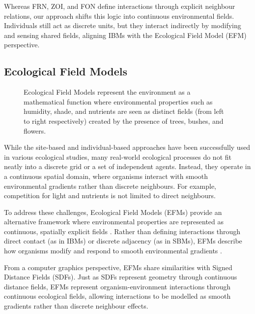 \midConclusion 

Whereas FRN, ZOI, and FON define interactions through explicit neighbour relations, our approach shifts this logic into continuous environmental fields. Individuals still act as discrete units, but they interact indirectly by modifying and sensing shared fields, aligning IBMs with the Ecological Field Model (EFM) perspective.

\subsection{Ecological Field Models}

\begin{figure}
    \caption{Ecological Field Models represent the environment as a mathematical function where environmental properties such as humidity, shade, and nutrients are seen as distinct fields (from left to right respectively) created by the presence of trees, bushes, and flowers.}
    \label{fig:env-obj-ecological-field-models}
\end{figure}

While the site-based and individual-based approaches have been successfully used in various ecological studies, many real-world ecological processes do not fit neatly into a discrete grid or a set of independent agents. Instead, they operate in a continuous spatial domain, where organisms interact with smooth environmental gradients rather than discrete neighbours. For example, competition for light and nutrients is not limited to direct neighbours.

To address these challenges, Ecological Field Models (EFMs) provide an alternative framework where environmental properties are represented as continuous, spatially explicit fields \cite{Wu1985}. Rather than defining interactions through direct contact (as in IBMs) or discrete adjacency (as in SBMs), EFMs describe how organisms modify and respond to smooth environmental gradients \cite{Chng2011b,Seidl2012}.

From a computer graphics perspective, EFMs share similarities with Signed Distance Fields (SDFs). Just as SDFs represent geometry through continuous distance fields, EFMs represent organism-environment interactions through continuous ecological fields, allowing interactions to be modelled as smooth gradients rather than discrete neighbour effects.


